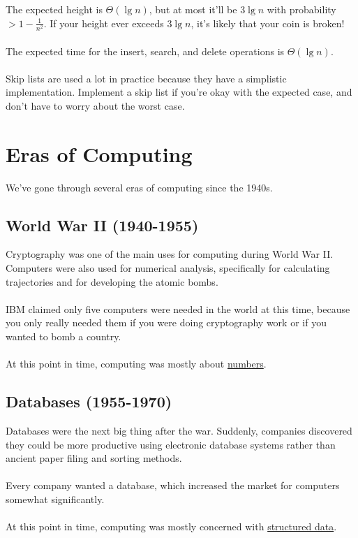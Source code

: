 \documentclass[]{article}
\theoremstyle{definition}
\begin{document}
			\\ \\
			The expected height is $\Theta(\lg n)$, but at most it'll be $3 \lg n$ with probability $> 1 - \frac{1}{n^2}$. If your height ever exceeds $3 \lg n$, it's likely that your coin is broken!
			\\ \\
			The expected time for the insert, search, and delete operations is $\Theta(\lg n)$.
			\\ \\
			Skip lists are used a lot in practice because they have a simplistic implementation. Implement a skip list if you're okay with the expected case, and don't have to worry about the worst case.

	\section{Eras of Computing}
		We've gone through several eras of computing since the 1940s.
		\subsection{World War II (1940-1955)}
			Cryptography was one of the main uses for computing during World War II. Computers were also used for numerical analysis, specifically for calculating trajectories and for developing the atomic bombs.
			\\ \\
			IBM claimed only five computers were needed in the world at this time, because you only really needed them if you were doing cryptography work or if you wanted to bomb a country.
			\\ \\
			At this point in time, computing was mostly about \underline{numbers}.

		\subsection{Databases (1955-1970)}
			Databases were the next big thing after the war. Suddenly, companies discovered they could be more productive using electronic database systems rather than ancient paper filing and sorting methods.
			\\ \\
			Every company wanted a database, which increased the market for computers somewhat significantly.
			\\ \\
			At this point in time, computing was mostly concerned with \underline{structured data}.
\end{document}
